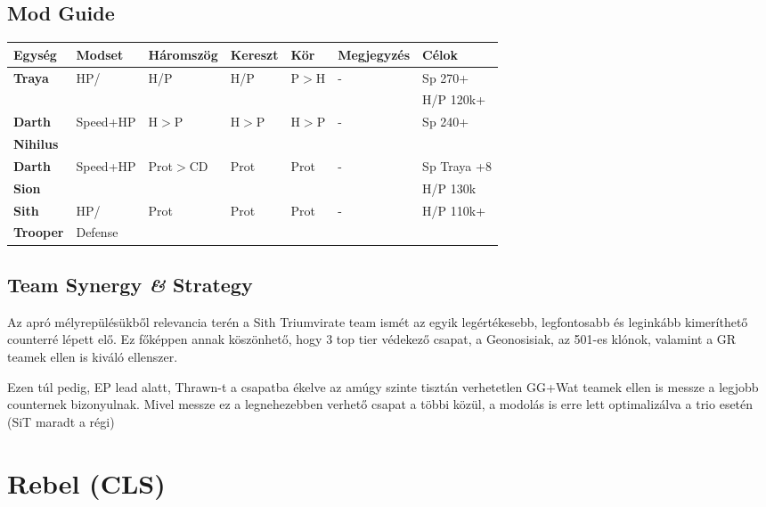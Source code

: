 \documentclass[11pt]{report}
\begin{document}
\section{Mod Guide}
\begin{center}
    \begin{tabular}{|l | l | l | l | l | l | l |}
        \hline
        Egység & Modset & Háromszög & Kereszt & Kör & Megjegyzés & Célok\\ \hline
        \textbf{Traya} & HP/ & H/P & H/P & P$>$H & - & Sp 270+\\
        &  &  &  &  &  & H/P 120k+ \\ \hline
        \textbf{Darth} & Speed+HP & H$>$P & H$>$P & H$>$P & - & Sp 240+\\
        \textbf{Nihilus} &  &  &  &  &  & \\ \hline
        \textbf{Darth} & Speed+HP & Prot$>$CD & Prot & Prot & - & Sp Traya +8\\
        \textbf{Sion} &  &  &  &  &  & H/P 130k\\ \hline
        \textbf{Sith} & HP/ & Prot & Prot & Prot & - & H/P 110k+\\
        \textbf{Trooper} & Defense &  &  &  &  & \\ \hline              
    \end{tabular}
\end{center}
\section{Team Synergy \textit{\&} Strategy}
Az apró mélyrepülésükből relevancia terén a Sith Triumvirate team ismét az egyik legértékesebb, legfontosabb és leginkább kimeríthető counterré lépett elő. Ez főképpen annak köszönhető, hogy 3 top tier védekező csapat, a Geonosisiak, az 501-es klónok, valamint a GR teamek ellen is kiváló ellenszer.\par
Ezen túl pedig, EP lead alatt, Thrawn-t a csapatba ékelve az amúgy szinte tisztán verhetetlen GG+Wat teamek ellen is messze a legjobb counternek bizonyulnak. Mivel messze ez a legnehezebben verhető csapat a többi közül, a modolás is erre lett optimalizálva a trio esetén (SiT maradt a régi)


\chapter{Rebel (CLS)}
\end{document}
